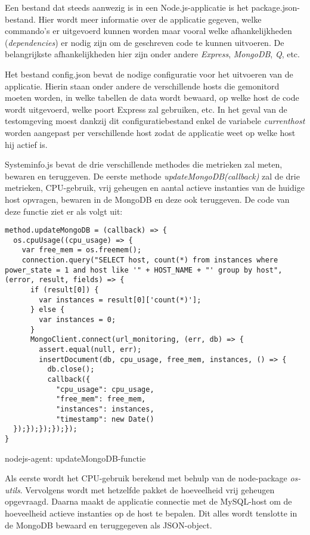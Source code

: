 Een bestand dat steeds aanwezig is in een Node.js-applicatie is het package.json-bestand. Hier wordt meer informatie over de applicatie gegeven, welke commando's er uitgevoerd kunnen worden maar vooral welke afhankelijkheden (\textit{dependencies}) er nodig zijn om de geschreven code te kunnen uitvoeren. De belangrijkste afhankelijkheden hier zijn onder andere \textit{Express}, \textit{MongoDB}, \textit{Q}, etc.

Het bestand config.json bevat de nodige configuratie voor het uitvoeren van de applicatie. Hierin staan onder andere de verschillende hosts die gemonitord moeten worden, in welke tabellen de data wordt bewaard, op welke host de code wordt uitgevoerd, welke poort Express zal gebruiken, etc. In het geval van de testomgeving moest dankzij dit configuratiebestand enkel de variabele \textit{current\textunderscore host} worden aangepast per verschillende host zodat de applicatie weet op welke host hij actief is.

Systeminfo.js bevat de drie verschillende methodes die metrieken zal meten, bewaren en teruggeven. De eerste methode \textit{updateMongoDB(callback)} zal de drie metrieken, CPU-gebruik, vrij geheugen en aantal actieve instanties van de huidige host opvragen, bewaren in de MongoDB en deze ook teruggeven. De code van deze functie ziet er als volgt uit:

\begin{code}
\begin{verbatim}
method.updateMongoDB = (callback) => {
  os.cpuUsage((cpu_usage) => {
    var free_mem = os.freemem();
    connection.query("SELECT host, count(*) from instances where power_state = 1 and host like '" + HOST_NAME + "' group by host", (error, result, fields) => {
      if (result[0]) {
        var instances = result[0]['count(*)'];
      } else {
        var instances = 0;
      }
      MongoClient.connect(url_monitoring, (err, db) => {
        assert.equal(null, err);
        insertDocument(db, cpu_usage, free_mem, instances, () => {
          db.close();
          callback({
            "cpu_usage": cpu_usage,
            "free_mem": free_mem,
            "instances": instances,
            "timestamp": new Date()
  });});});});});
}
\end{verbatim}
\caption{nodejs-agent: updateMongoDB-functie}
\end{code}

Als eerste wordt het CPU-gebruik berekend met behulp van de node-package \textit{os-utils}. Vervolgens wordt met hetzelfde pakket de hoeveelheid vrij geheugen opgevraagd. Daarna maakt de applicatie connectie met de MySQL-host om de hoeveelheid actieve instanties op de host te bepalen. Dit alles wordt tenslotte in de MongoDB bewaard en teruggegeven als JSON-object.

